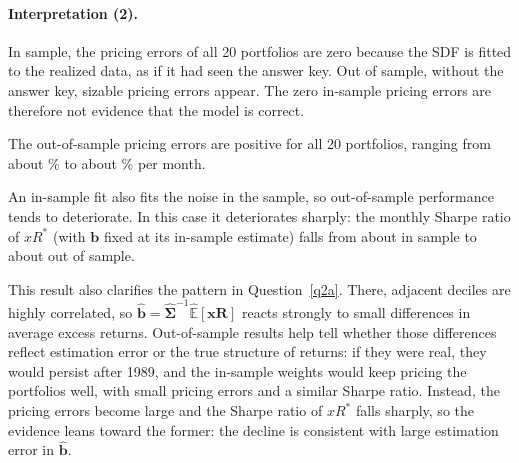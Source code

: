 \documentclass[11pt]{article}
\begin{document}
\begin{table}[htbp]
  \centering
  
  \caption{In-sample and out-of-sample pricing errors of the 20 book-to-market and momentum decile
    portfolios under the BM + MOM SDF (the Question~\ref{q2c} construction with all 20 portfolios).
    In-sample (Q2(d)): $\hat{\alpha}_p = \widehat{\mathbb{E}}[xR_p] - \widehat{\mathrm{Cov}}[-M^*, xR_p]$,
    with the SDF estimated and evaluated on July 1927 to \QtwoeEnd{} ($T = \QtwocT$ months); zero by
    construction. Out-of-sample (Q2(e)):
    $\hat{\alpha}_{OS,p} = \widehat{\mathbb{E}}[xR_p] - \widehat{\mathrm{Cov}}[-M^*_{OS}, xR_p]$, with
    $\hat{a}$ and $\hat{\mathbf{b}}$ estimated on July 1927 to December 1989 ($T = \QtwoeTis$ months) and
    $M^*_{OS,t} = \hat{a} - \hat{\mathbf{b}}'\mathbf{xR}_t$ and the moments computed on January 1990 to
    \QtwoeEnd{} ($T = \QtwoeTos$ months). Data: monthly value-weighted returns (one-month horizon) in excess
    of the Fama--French risk-free rate. Units: percent per month. Covariances divide by $T$. No standard
    errors are reported.}
  \label{tab:q2e_alpha}
\end{table}

\paragraph{Interpretation (2).}
In sample, the pricing errors of all 20 portfolios are zero because the SDF is fitted to the realized data, as
if it had seen the answer key. Out of sample, without the answer key, sizable pricing errors appear. The zero
in-sample pricing errors are therefore not evidence that the model is correct.

The out-of-sample pricing errors are positive for all 20 portfolios, ranging from about \QtwoeAlphaMin\% to
about \QtwoeAlphaMax\% per month.

An in-sample fit also fits the noise in the sample, so out-of-sample performance tends to deteriorate. In this
case it deteriorates sharply: the monthly Sharpe ratio of $xR^*$ (with $\mathbf{b}$ fixed at its in-sample
estimate) falls from about \QtwoeSRis{} in sample to about \QtwoeSRos{} out of sample.

This result also clarifies the pattern in Question~\ref{q2a}. There, adjacent deciles are highly correlated, so
$\hat{\mathbf{b}} = \hat{\bm{\Sigma}}^{-1}\widehat{\mathbb{E}}[\mathbf{xR}]$ reacts strongly to small
differences in average excess returns. Out-of-sample results help tell whether those differences reflect
estimation error or the true structure of returns: if they were real, they would persist after 1989, and the
in-sample weights would keep pricing the portfolios well, with small pricing errors and a similar Sharpe ratio.
Instead, the pricing errors become large and the Sharpe ratio of $xR^*$ falls sharply, so the evidence leans
toward the former: the decline is consistent with large estimation error in $\hat{\mathbf{b}}$.
\end{document}
